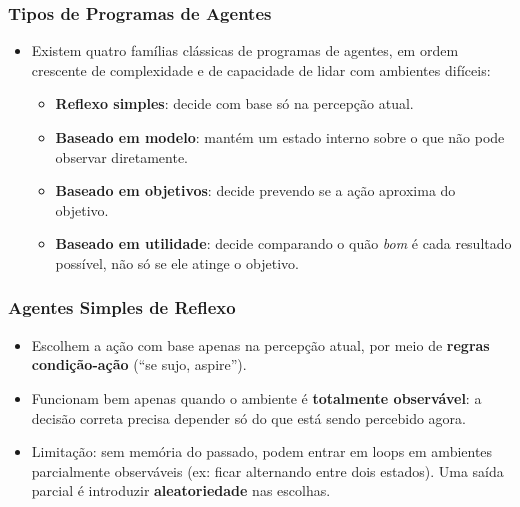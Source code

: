 \documentclass{beamer}
\begin{document}
\begin{frame}
\frametitle{Tipos de Programas de Agentes}
\begin{itemize}
    \item Existem quatro famílias clássicas de programas de agentes, em ordem crescente de complexidade e de capacidade de lidar com ambientes difíceis:
    \begin{itemize}
        \item \textbf{Reflexo simples}: decide com base só na percepção atual.
        \item \textbf{Baseado em modelo}: mantém um estado interno sobre o que não pode observar diretamente.
        \item \textbf{Baseado em objetivos}: decide prevendo se a ação aproxima do objetivo.
        \item \textbf{Baseado em utilidade}: decide comparando o quão \textit{bom} é cada resultado possível, não só se ele atinge o objetivo.
    \end{itemize}
\end{itemize}
\end{frame}

\begin{frame}
\frametitle{Agentes Simples de Reflexo}
\footnotesize
\begin{itemize}
    \item Escolhem a ação com base apenas na percepção atual, por meio de \textbf{regras condição-ação} (``se sujo, aspire'').
    \item Funcionam bem apenas quando o ambiente é \textbf{totalmente observável}: a decisão correta precisa depender só do que está sendo percebido agora.
    \item Limitação: sem memória do passado, podem entrar em loops em ambientes parcialmente observáveis (ex: ficar alternando entre dois estados). Uma saída parcial é introduzir \textbf{aleatoriedade} nas escolhas.
\end{itemize}
\begin{center}
\end{center}
\end{frame}
\end{document}
